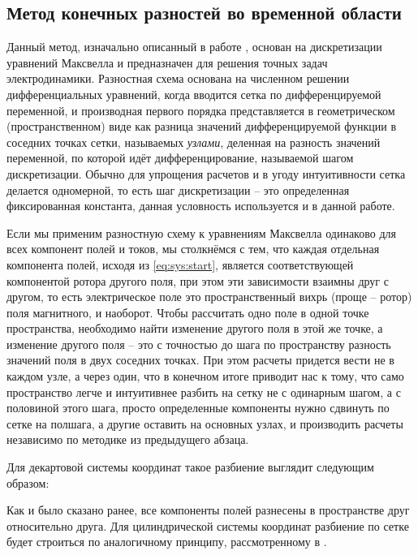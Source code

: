 \documentclass[a4paper]{article}
\begin{document}
\subsection{Метод конечных разностей во временной области}

Данный метод, изначально описанный в работе \cite{Yee1966}, основан на дискретизации уравнений Максвелла и предназначен для решения точных задач электродинамики. Разностная схема основана на численном решении дифференциальных уравнений, когда вводится сетка по дифференцируемой переменной, и производная первого порядка представляется в геометрическом (пространственном) виде как разница значений дифференцируемой функции в соседних точках сетки, называемых \textit{узлами}, деленная на разность значений переменной, по которой идёт дифференцирование, называемой шагом дискретизации. Обычно для упрощения расчетов и в угоду интуитивности сетка делается одномерной, то есть шаг дискретизации -- это определенная фиксированная константа, данная условность используется и в данной работе.

Если мы применим разностную схему к уравнениям Максвелла одинаково для всех компонент полей и токов, мы столкнёмся с тем, что каждая отдельная компонента полей, исходя из \eqref{eq:sys:start}, является соответствующей компонентой ротора другого поля, при этом эти зависимости взаимны друг с другом, то есть электрическое поле это пространственный вихрь (проще -- ротор) поля магнитного, и наоборот. Чтобы рассчитать одно поле в одной точке пространства, необходимо найти изменение другого поля в этой же точке, а изменение другого поля -- это с точностью до шага по пространству разность значений поля в двух соседних точках. При этом расчеты придется вести не в каждом узле, а через один, что в конечном итоге приводит нас к тому, что само пространство легче и интуитивнее разбить на сетку не с одинарным шагом, а с половиной этого шага, просто определенные компоненты нужно сдвинуть по сетке на полшага, а другие оставить на основных узлах, и производить расчеты независимо по методике из предыдущего абзаца.

Для декартовой системы координат такое разбиение выглядит следующим образом:
	
Как и было сказано ранее, все компоненты полей разнесены в пространстве друг относительно друга. Для цилиндрической системы координат разбиение по сетке будет строиться по аналогичному принципу, рассмотренному в \cite{fdtd_cyll}.	
\end{document}
